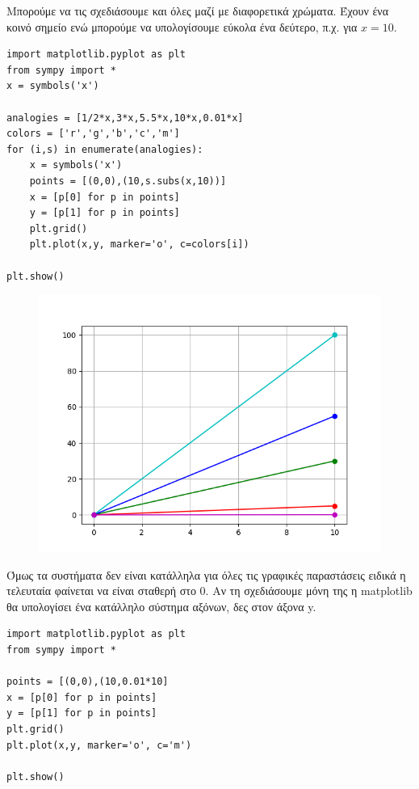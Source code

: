 Μπορούμε να τις σχεδιάσουμε και όλες μαζί με διαφορετικά χρώματα. Έχουν ένα κοινό σημείο ενώ μπορούμε να υπολογίσουμε εύκολα ένα δεύτερο, π.χ. για $x=10$.
\begin{lstlisting}
import matplotlib.pyplot as plt
from sympy import *
x = symbols('x')

analogies = [1/2*x,3*x,5.5*x,10*x,0.01*x]
colors = ['r','g','b','c','m']
for (i,s) in enumerate(analogies):
    x = symbols('x')
    points = [(0,0),(10,s.subs(x,10))]
    x = [p[0] for p in points]
    y = [p[1] for p in points]
    plt.grid()
    plt.plot(x,y, marker='o', c=colors[i])

plt.show()
\end{lstlisting}
\begin{figure}
\includegraphics{sel101_2.png}
\end{figure}
Όμως τα συστήματα δεν είναι κατάλληλα για όλες τις γραφικές παραστάσεις ειδικά η τελευταία φαίνεται να είναι σταθερή στο 0. Αν τη σχεδιάσουμε μόνη της η matplotlib θα υπολογίσει ένα κατάλληλο σύστημα αξόνων, δες στον άξονα y.
\begin{lstlisting}
import matplotlib.pyplot as plt
from sympy import *

points = [(0,0),(10,0.01*10]
x = [p[0] for p in points]
y = [p[1] for p in points]
plt.grid()
plt.plot(x,y, marker='o', c='m')

plt.show()
\end{lstlisting}
